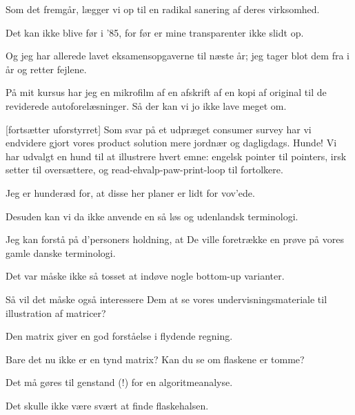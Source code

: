 \documentclass[a4paper,11pt]{article}
\begin{document}
\begin{sketch}
 Som det fremgår, lægger vi op til en radikal sanering af
deres virksomhed.

 Det kan ikke blive før i '85, for før er mine transparenter
ikke slidt op.

 Og jeg har allerede lavet eksamensopgaverne til næste år; jeg
tager blot dem fra i år og retter fejlene.

 På mit kursus har jeg en mikrofilm af en afskrift af en kopi af
original til de reviderede autoforelæsninger.  Så der kan vi jo ikke
lave meget om.

[fortsætter uforstyrret] Som svar på et udpræget consumer survey har vi
endvidere gjort vores product solution mere jordnær og dagligdags.  Hunde!  Vi
har udvalgt en hund til at illustrere hvert emne: engelsk pointer til pointers,
irsk setter til oversættere, og read-ehvalp-paw-print-loop til fortolkere.


 Jeg er hunderæd for, at disse her planer er lidt for vov'ede.

 Desuden kan vi da ikke anvende en så løs og udenlandsk terminologi.


 Jeg kan forstå på d'personers holdning, at De ville
foretrække en prøve på vores gamle danske terminologi. 

 Det var måske ikke så tosset at indøve nogle bottom-up varianter.


 Så vil det måske også interessere Dem at se vores
undervisningsmateriale til illustration af matricer? 

 Den matrix giver en god forståelse i flydende regning. 

 Bare det nu ikke er en tynd matrix?  Kan du se om flaskene er tomme?

 Det må gøres til genstand (!) for en algoritmeanalyse.

 Det skulle ikke være svært at finde flaskehalsen.



\end{sketch}
\end{document}
